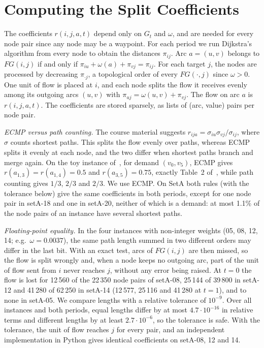 \documentclass[conference]{IEEEtran}
\begin{document}
\section{Computing the Split Coefficients}\label{sec:r}

The coefficients $r(i,j,a,t)$ depend only on $G_t$ and $\omega$, and are needed for every node pair since any node may be a waypoint. For each period we run Dijkstra's algorithm from every node to obtain the distances $\pi_{ij}$. Arc $a=(u,v)$ belongs to $FG(i,j)$ if and only if $\pi_{iu}+\omega(a)+\pi_{vj}=\pi_{ij}$. For each target $j$, the nodes are processed by decreasing $\pi_{\cdot j}$, a topological order of every $FG(\cdot,j)$ since $\omega>0$. One unit of flow is placed at $i$, and each node splits the flow it receives evenly among its outgoing arcs $(u,v)$ with $\pi_{uj}=\omega(u,v)+\pi_{vj}$. The flow on arc $a$ is $r(i,j,a,t)$. The coefficients are stored sparsely, as lists of (arc, value) pairs per node pair.

\emph{ECMP versus path counting.} The course material suggests $r_{ija}=\sigma_{iu}\sigma_{vj}/\sigma_{ij}$, where $\sigma$ counts shortest paths. This splits the flow evenly over paths, whereas ECMP splits it evenly at each node, and the two differ when shortest paths branch and merge again. On the toy instance of~\cite{subject}, for demand $(v_0,v_5)$, ECMP gives $r(a_{1,3})=r(a_{1,4})=0.5$ and $r(a_{3,5})=0.75$, exactly Table~2 of~\cite{subject}, while path counting gives $1/3$, $2/3$ and $2/3$. We use ECMP. On SetA both rules (with the tolerance below) give the same coefficients in both periods, except for one node pair in setA-18 and one in setA-20, neither of which is a demand: at most 1.1\% of the node pairs of an instance have several shortest paths.

\emph{Floating-point equality.} In the four instances with non-integer weights (05, 08, 12, 14; e.g.\ $\omega=0.0037$), the same path length summed in two different orders may differ in the last bit. With an exact test, arcs of $FG(i,j)$ are then missed, so the flow is split wrongly and, when a node keeps no outgoing arc, part of the unit of flow sent from $i$ never reaches $j$, without any error being raised. At $t=0$ the flow is lost for 12\,560 of the 22\,350 node pairs of setA-08, 25\,144 of 39\,800 in setA-12 and 41\,280 of 62\,250 in setA-14 (12\,577, 25\,116 and 41\,280 at $t=1$), and to none in setA-05. We compare lengths with a relative tolerance of $10^{-9}$. Over all instances and both periods, equal lengths differ by at most $4.7\cdot10^{-16}$ in relative terms and different lengths by at least $2.7\cdot10^{-6}$, so the tolerance is safe. With the tolerance, the unit of flow reaches $j$ for every pair, and an independent implementation in Python gives identical coefficients on setA-08, 12 and 14.
\end{document}
